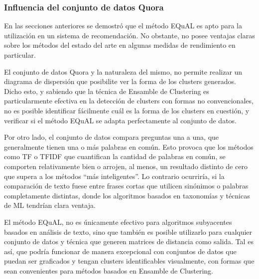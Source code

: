 \subsubsection{Influencia del conjunto de datos Quora}
En las secciones anteriores se demostró que el método EQuAL es apto para la utilización en un sistema de recomendación. No obstante, no posee ventajas claras sobre los métodos del estado del arte en algunas medidas de rendimiento en particular.

\bigskip El conjunto de datos Quora y la naturaleza del mismo, no permite realizar un diagrama de dispersión que posibilite ver la forma de los clusters generados. Dicho esto, y sabiendo que la técnica de Ensamble de Clustering es particularmente efectiva en la detección de clusters con formas no convencionales, no es posible identificar fácilmente cuál es la forma de los clusters en cuestión, y verificar si el método EQuAL se adapta perfectamente al conjunto de datos.

\bigskip Por otro lado, el conjunto de datos compara preguntas una a una, que generalmente tienen una o más palabras en común. Esto provoca que los métodos como TF o TFIDF que cuantifican la cantidad de palabras en común, se comporten relativamente bien o arrojen, al menos, un  resultado distinto de cero que supera a los métodos “más inteligentes”. Lo contrario ocurriría, si la comparación de texto fuese entre frases cortas que utilicen sinónimos o palabras completamente distintas, donde los algoritmos basados en taxonomías y técnicas de ML tendrían clara ventaja.

\bigskip El método EQuAL, no es únicamente efectivo para algoritmos subyacentes basados en análisis de texto, sino que también es posible utilizarlo para cualquier conjunto de datos y técnica que generen matrices de distancia como salida. Tal es así, que podría funcionar de manera excepcional con conjuntos de datos que puedan ser graficados y tengan clusters identificables visualmente, con formas que sean convenientes para métodos basados en Ensamble de Clustering.
